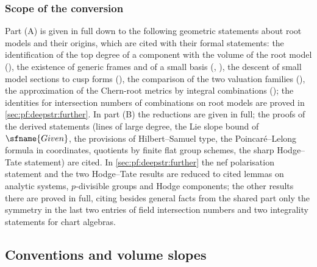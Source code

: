 \subsubsection*{Scope of the conversion}
Part (A) is given in full down to the following geometric statements about root models and their origins,
which are cited with their formal statements: the identification of the top degree of a component with
the volume of the root model (), the existence of
generic frames and of a small basis (,
), the descent of small model sections to cusp forms
(), the comparison of the two valuation families
(), the approximation of the Chern-root metrics by integral
combinations (); the identities for intersection numbers
of combinations on root models are proved in \cref{sec:pf:deepstr:further}.
In part (B) the reductions are given in full; the proofs of the derived statements (lines of large degree,
the Lie slope bound of $\sfname{Given}$, the provisions of Hilbert--Samuel type, the Poincar\'e--Lelong formula
in coordinates, quotients by finite flat group schemes, the sharp Hodge--Tate statement) are cited. In
\cref{sec:pf:deepstr:further} the nef polarisation statement and the two Hodge--Tate results are reduced to
cited lemmas on analytic systems, $p$-divisible groups and Hodge components; the other results there are
proved in full, citing besides general facts from the shared part only the symmetry in the last two entries
of field intersection numbers and two integrality statements for chart algebras.

\subsection{Conventions and volume slopes}\label{sec:pf:deepstr:conv}

